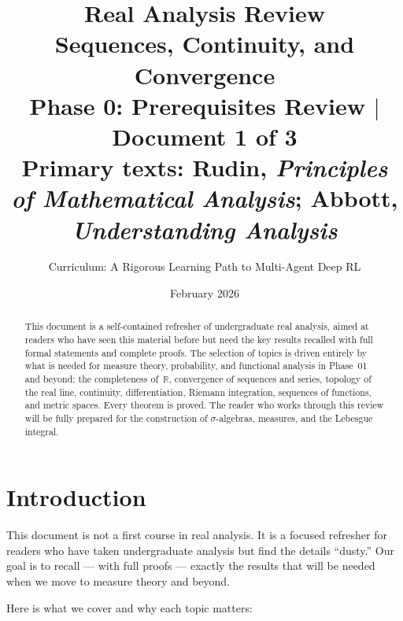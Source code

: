 \documentclass[11pt,a4paper]{article}
\title{\textbf{Real Analysis Review}\\[10pt]
\large Sequences, Continuity, and Convergence\\[5pt]
\normalsize Phase 0: Prerequisites Review $\mid$ Document 1 of 3\\
\normalsize Primary texts: Rudin, \emph{Principles of Mathematical Analysis}; Abbott, \emph{Understanding Analysis}}
\author{Curriculum: A Rigorous Learning Path to Multi-Agent Deep RL}
\date{February 2026}
\theoremstyle{definition}
\theoremstyle{plain}
\theoremstyle{remark}
\newcommand{\R}{\mathbb{R}}
\begin{document}
\maketitle

\begin{abstract}
This document is a self-contained refresher of undergraduate real analysis, aimed at
readers who have seen this material before but need the key results recalled with full
formal statements and complete proofs. The selection of topics is driven entirely by
what is needed for measure theory, probability, and functional analysis in Phase~01
and beyond: the completeness of~$\R$, convergence of sequences and series, topology
of the real line, continuity, differentiation, Riemann integration, sequences of
functions, and metric spaces. Every theorem is proved. The reader who works through
this review will be fully prepared for the construction of $\sigma$-algebras, measures,
and the Lebesgue integral.
\end{abstract}

\tableofcontents
\newpage

\section{Introduction}
\label{sec:introduction}

This document is not a first course in real analysis. It is a focused refresher for
readers who have taken undergraduate analysis but find the details ``dusty.'' Our goal
is to recall --- with full proofs --- exactly the results that will be needed when we
move to measure theory and beyond.

Here is what we cover and why each topic matters:
\end{document}
